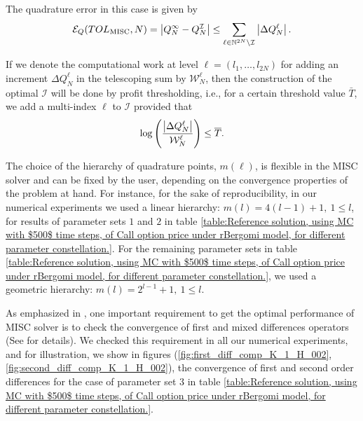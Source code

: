 The quadrature error in this  case  is given by
\begin{equation}\label{eq:quadrature error}
	\mathcal{E}_Q(TOL_{\text{MISC}},N) =\left\lvert Q_N^\infty - Q_N^\mathcal{I}\right\rvert \le \sum_{\ell \in \mathbb{N}^{2N} \setminus
		\mathcal{I}} \left\lvert\Delta Q_N^\ell\right\rvert.
\end{equation}

If we denote the computational work at level $\ell = (l_1, \ldots, l_{2N})$ for adding an increment $\Delta Q_N^{\ell}$
in the telescoping sum by  $\mathcal{W}_N^\ell$, then the  construction of the optimal  $\mathcal{I}$ will be done by profit thresholding, i.e.,
for a certain threshold value $\bar{T}$, we add a multi-index $\ell$ to
$\mathcal{I}$ provided that
\begin{equation*}
	\log\left( \frac{\left\lvert\Delta Q_N^\ell\right\rvert}{\mathcal{W}_N^ \ell} \right) \le \overline{T}.
\end{equation*}



\begin{remark}
	The choice of the hierarchy of quadrature points, $m(\ell)$, is flexible in the MISC solver and can be fixed by the user, depending on the convergence properties of the problem at hand. For instance, for the sake of reproducibility, in our numerical experiments we used a linear hierarchy: $m(l)=4 (l-1)+1,\: 1 \le l $, for results of parameter sets $1$ and $2$ in table \ref{table:Reference solution, using MC with $500$ time steps, of Call option price under rBergomi model, for different parameter constellation.}. For the remaining parameter sets in table  \ref{table:Reference solution, using MC with $500$ time steps, of Call option price under rBergomi model, for different parameter constellation.}, we used a geometric hierarchy: $m(l)=2^{l-1}+1, \:1 \le l $.
\end{remark} 


\begin{remark}
As emphasized in \cite{haji2016multi}, one important requirement to get the optimal performance of MISC solver is to check  the convergence of first and mixed differences operators (See \cite{haji2016multi} for details). We checked this requirement in all our numerical experiments, and for illustration, we show in figures (\ref{fig:first_diff_comp_K_1_H_002}, \ref{fig:second_diff_comp_K_1_H_002}), the convergence of first and second order differences for the case of parameter set $3$ in table \ref{table:Reference solution, using MC with $500$ time steps, of Call option price under rBergomi model, for different parameter constellation.}. 
\end{remark} 

